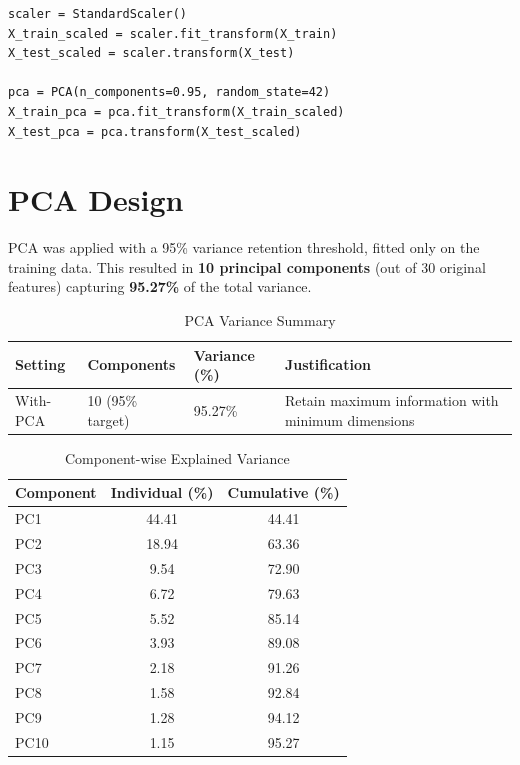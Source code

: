 \documentclass[12pt,a4paper]{article}
\begin{document}
\begin{lstlisting}[caption={Preprocessing and PCA Pipeline}]
scaler = StandardScaler()
X_train_scaled = scaler.fit_transform(X_train)
X_test_scaled = scaler.transform(X_test)

pca = PCA(n_components=0.95, random_state=42)
X_train_pca = pca.fit_transform(X_train_scaled)
X_test_pca = pca.transform(X_test_scaled)
\end{lstlisting}

\section{PCA Design}

PCA was applied with a 95\% variance retention threshold, fitted only on the training data. This resulted in \textbf{10 principal components} (out of 30 original features) capturing \textbf{95.27\%} of the total variance.

\begin{table}[H]
\centering
\caption{PCA Variance Summary}
\label{tab:pca_summary}
\vspace{0.2cm}
\begin{tabular}{llll}
\toprule
\textbf{Setting} & \textbf{Components} & \textbf{Variance (\%)} & \textbf{Justification} \\
\midrule
With-PCA & 10 (95\% target) & 95.27\% & Retain maximum information with minimum dimensions \\
\bottomrule
\end{tabular}
\end{table}

\begin{table}[H]
\centering
\caption{Component-wise Explained Variance}
\label{tab:pca_components}
\vspace{0.2cm}
\begin{tabular}{lcc}
\toprule
\textbf{Component} & \textbf{Individual (\%)} & \textbf{Cumulative (\%)} \\
\midrule
PC1 & 44.41 & 44.41 \\
PC2 & 18.94 & 63.36 \\
PC3 & 9.54 & 72.90 \\
PC4 & 6.72 & 79.63 \\
PC5 & 5.52 & 85.14 \\
PC6 & 3.93 & 89.08 \\
PC7 & 2.18 & 91.26 \\
PC8 & 1.58 & 92.84 \\
PC9 & 1.28 & 94.12 \\
PC10 & 1.15 & 95.27 \\
\bottomrule
\end{tabular}
\end{table}
\end{document}
